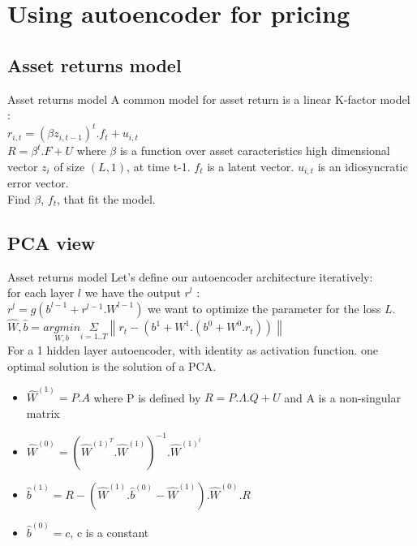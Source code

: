 \documentclass{beamer}
\newcommand{\norm}[1]{\left\lVert#1\right\rVert}
\begin{document}
\section{Using autoencoder for pricing}
\subsection{Asset returns model}
\begin{frame}{Asset returns model}
	A common model for asset return is a linear K-factor model : \\
	$r_{i,t} = (\beta z_{i,t - 1})^{t}.f_t + u_{i,t}$ \\
    $R = \beta^t.F + U$
	where $\beta$ is a function over asset caracteristics high dimensional vector $z_i$ of size $(L, 1)$, at time t-1.
	$f_t$ is a latent vector. $u_{i,t}$ is an idiosyncratic error vector. \\
	Find $\beta$, $f_t$, that fit the model.
\end{frame}

\subsection{PCA view}
\begin{frame}{Asset returns model}
    Let's define our autoencoder architecture iteratively: \\
    for each layer $l$ we have the output $r^{l}$ : \\
    $r^{l} = g(b^{l-1} + r^{l-1}.W^{l-1})$
    we want to optimize the parameter for the loss $L$.
    $\hat{W},\hat{b} = \underset{W,b}{argmin} \underset{i=1..T}{\Sigma} \norm{r_t - (b^{1} + W^{1}.(b^{0} + W^{0}. r_t))}$ \\
    For a 1 hidden layer autoencoder, with identity as activation function. one optimal solution is the solution of a PCA. \\
    \begin{itemize}
	    \item $\hat{W}^{(1)} = P.A$ where P is defined by $R = P.\Lambda.Q + U$ and A is a non-singular matrix \\
	    \item $\hat{W}^{(0)} = (\hat{W}^{(1)}^{T}.\hat{W}^{(1)})^{-1}.\hat{W}^{(1)}^t$ \\
	    \item $\hat{b}^{(1)} = R - (\hat{W}^{(1)}.\hat{b}^{(0)} - \hat{W}^{(1)}).\hat{W}^{(0)}.R$ \\
	    \item $\hat{b}^{(0)} = c$, c is a constant
    \end{itemize}
\end{frame}
\end{document}
